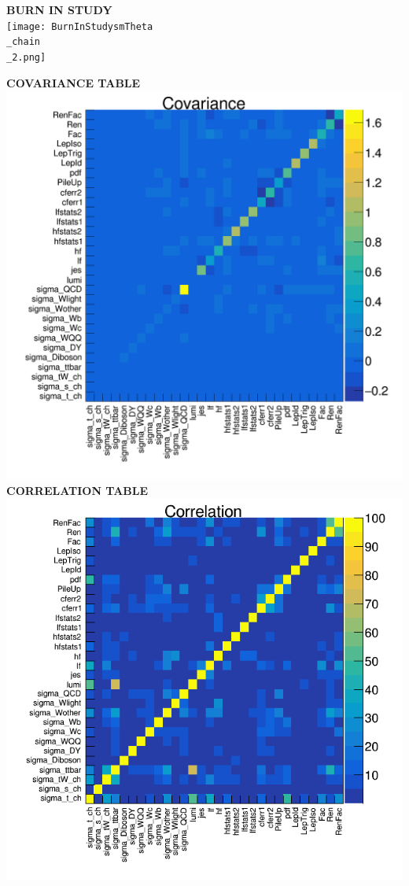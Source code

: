 \documentclass{article}
\begin{document}
\begin{tiny}
 \newpage 

 \textbf{BURN IN STUDY} \\ 
 \texttt{[image: BurnInStudysmTheta\\\_chain\\\_2.png]} 
 \newpage 

 \textbf{COVARIANCE TABLE} \\ 
 \includegraphics[width=0.7\linewidth]{Covsm.png} 
 \\ \textbf{CORRELATION TABLE} \\ 
 \includegraphics[width=0.7\linewidth]{Corsm.png} 
 \newpage 


\end{tiny}
\end{document}
